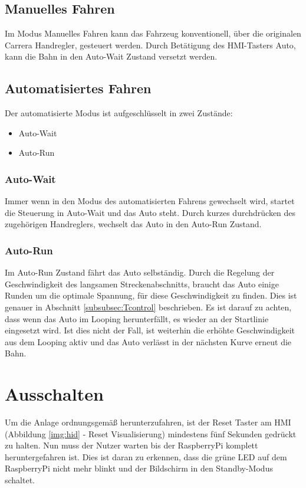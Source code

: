 \documentclass[a4paper, 11pt]{report}
\begin{document}
	\subsection{Manuelles Fahren}\label{subsec:ManuellesFahren}
		Im Modus Manuelles Fahren kann das Fahrzeug konventionell, über die originalen Carrera Handregler, gesteuert werden. Durch Betätigung des HMI-Tasters Auto, kann die Bahn in den Auto-Wait Zustand versetzt werden. 
\newpage
	\subsection{Automatisiertes Fahren}\label{subsec:bedAuto}
		Der automatisierte Modus ist aufgeschlüsselt in zwei Zustände:
		\begin{itemize}
			\item Auto-Wait
			\item Auto-Run
		\end{itemize}
		\subsubsection{Auto-Wait}
		Immer wenn in den Modus des automatisierten Fahrens gewechselt wird, startet die Steuerung in
		Auto-Wait und das Auto steht.
		Durch kurzes durchdrücken des zugehörigen Handreglers, wechselt das Auto in den Auto-Run Zustand.
		\subsubsection{Auto-Run}
			Im Auto-Run Zustand fährt das Auto selbständig. Durch die Regelung der Geschwindigkeit des langsamen Streckenabschnitts, 
			braucht das Auto einige Runden um die optimale Spannung, für diese Geschwindigkeit zu finden. Dies ist genauer in Abschnitt \ref{subsubsec:Tcontrol} beschrieben.
			Es ist darauf zu achten, dass wenn das Auto im Looping herunterfällt, es wieder an der Startlinie eingesetzt wird. Ist dies nicht der Fall, 
			ist weiterhin die erhöhte Geschwindigkeit aus dem Looping aktiv und das Auto verlässt in der nächsten Kurve erneut die Bahn. 
\section{Ausschalten}
Um die Anlage ordnungsgemäß herunterzufahren, ist der Reset Taster am HMI (Abbildung \ref{img:hid} - Reset Visualisierung) mindestens fünf Sekunden gedrückt zu halten.
Nun muss der Nutzer warten bis der RaspberryPi komplett heruntergefahren ist. Dies ist daran zu erkennen, dass die grüne LED auf dem RaspberryPi nicht mehr blinkt und der Bildschirm in den Standby-Modus schaltet.
\end{document}
